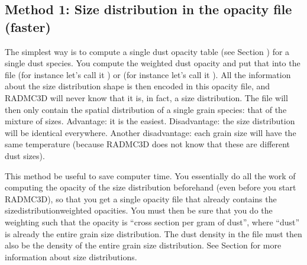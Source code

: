 \documentclass[letterpaper,10pt,english]{sphinxmanual}
\begin{document}
\subsection{Method 1: Size distribution in the opacity file (faster)}
\label{\detokenize{dustradtrans:method-1-size-distribution-in-the-opacity-file-faster}}\label{\detokenize{dustradtrans:sec-grain-size-distributions-method-1}}
The simplest way is to compute a single dust opacity table (see Section
{\hyperref[\detokenize{inputoutputfiles:sec-opacities}]{}}) for a single dust species. You compute the weighted dust
opacity and put that into the file  (for instance let’s
call it ) or  (for
instance let’s call it ).  All the information
about the size distribution shape is then encoded in this opacity file, and
RADMC\sphinxhyphen{}3D will never know that it is, in fact, a size distribution. The file
 will then only contain the spatial distribution of a single
grain species: that of the mixture of sizes. Advantage: it is the
easiest. Disadvantage: the size distribution will be identical
everywhere. Another disadvantage: each grain size will have the same temperature
(because RADMC\sphinxhyphen{}3D does not know that these are different dust sizes).

This method be useful to save computer time. You essentially do all the work of
computing the opacity of the size distribution beforehand (even before you start
RADMC\sphinxhyphen{}3D), so that you get a single opacity file that already contains the
size\sphinxhyphen{}distribution\sphinxhyphen{}weighted opacities. You must then be sure that you do the
weighting such that the opacity is “cross section per gram of dust”, where
“dust” is already the entire grain size distribution. The dust density in the
 file must then also be the density of the entire grain size
distribution. See Section {\hyperref[\detokenize{dustradtrans:sec-math-of-grain-size-distributions}]{}} for more
information about size distributions.
\end{document}
